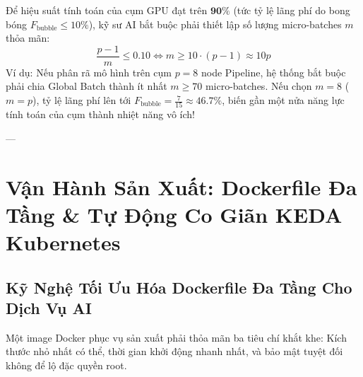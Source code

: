 \begin{corollary}
Để hiệu suất tính toán của cụm GPU đạt trên $\mathbf{90\%}$ (tức tỷ lệ lãng phí do bong bóng $F_{\text{bubble}} \le 10\%$), kỹ sư AI bắt buộc phải thiết lập số lượng micro-batches $m$ thỏa mãn:
\begin{equation}
\frac{p - 1}{m} \le 0.10 \iff m \ge 10 \cdot (p - 1) \approx 10 p
\end{equation}
Ví dụ: Nếu phân rã mô hình trên cụm $p = 8$ node Pipeline, hệ thống bắt buộc phải chia Global Batch thành ít nhất $m \ge 70$ micro-batches. Nếu chọn $m = 8$ ($m = p$), tỷ lệ lãng phí lên tới $F_{\text{bubble}} = \frac{7}{15} \approx \mathbf{46.7\%}$, biến gần một nửa năng lực tính toán của cụm thành nhiệt năng vô ích!
\end{corollary}

---

\section{Vận Hành Sản Xuất: Dockerfile Đa Tầng \& Tự Động Co Giãn KEDA Kubernetes}
\label{sec:production-docker-keda}

\subsection{Kỹ Nghệ Tối Ưu Hóa Dockerfile Đa Tầng Cho Dịch Vụ AI}
Một image Docker phục vụ sản xuất phải thỏa mãn ba tiêu chí khắt khe: Kích thước nhỏ nhất có thể, thời gian khởi động nhanh nhất, và bảo mật tuyệt đối không để lộ đặc quyền root.

